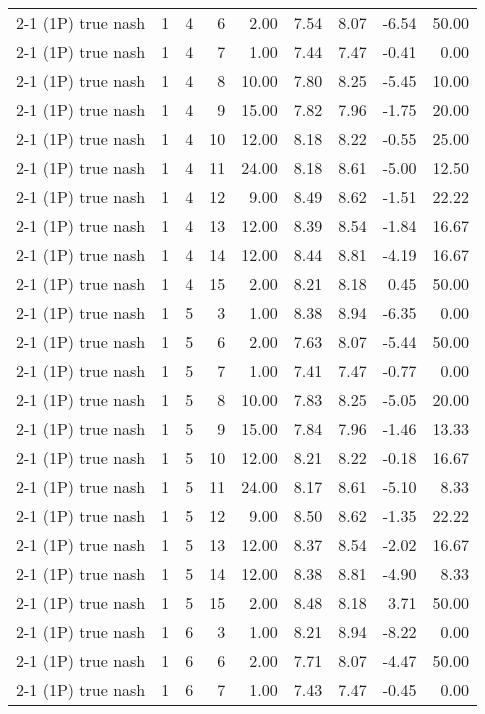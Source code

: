\begin{tabular}{lrrrrrrrr}
2-1 (1P) true nash & 1 & 4 & 6 & 2.00 & 7.54 & 8.07 & -6.54 & 50.00 \\
2-1 (1P) true nash & 1 & 4 & 7 & 1.00 & 7.44 & 7.47 & -0.41 & 0.00 \\
2-1 (1P) true nash & 1 & 4 & 8 & 10.00 & 7.80 & 8.25 & -5.45 & 10.00 \\
2-1 (1P) true nash & 1 & 4 & 9 & 15.00 & 7.82 & 7.96 & -1.75 & 20.00 \\
2-1 (1P) true nash & 1 & 4 & 10 & 12.00 & 8.18 & 8.22 & -0.55 & 25.00 \\
2-1 (1P) true nash & 1 & 4 & 11 & 24.00 & 8.18 & 8.61 & -5.00 & 12.50 \\
2-1 (1P) true nash & 1 & 4 & 12 & 9.00 & 8.49 & 8.62 & -1.51 & 22.22 \\
2-1 (1P) true nash & 1 & 4 & 13 & 12.00 & 8.39 & 8.54 & -1.84 & 16.67 \\
2-1 (1P) true nash & 1 & 4 & 14 & 12.00 & 8.44 & 8.81 & -4.19 & 16.67 \\
2-1 (1P) true nash & 1 & 4 & 15 & 2.00 & 8.21 & 8.18 & 0.45 & 50.00 \\
2-1 (1P) true nash & 1 & 5 & 3 & 1.00 & 8.38 & 8.94 & -6.35 & 0.00 \\
2-1 (1P) true nash & 1 & 5 & 6 & 2.00 & 7.63 & 8.07 & -5.44 & 50.00 \\
2-1 (1P) true nash & 1 & 5 & 7 & 1.00 & 7.41 & 7.47 & -0.77 & 0.00 \\
2-1 (1P) true nash & 1 & 5 & 8 & 10.00 & 7.83 & 8.25 & -5.05 & 20.00 \\
2-1 (1P) true nash & 1 & 5 & 9 & 15.00 & 7.84 & 7.96 & -1.46 & 13.33 \\
2-1 (1P) true nash & 1 & 5 & 10 & 12.00 & 8.21 & 8.22 & -0.18 & 16.67 \\
2-1 (1P) true nash & 1 & 5 & 11 & 24.00 & 8.17 & 8.61 & -5.10 & 8.33 \\
2-1 (1P) true nash & 1 & 5 & 12 & 9.00 & 8.50 & 8.62 & -1.35 & 22.22 \\
2-1 (1P) true nash & 1 & 5 & 13 & 12.00 & 8.37 & 8.54 & -2.02 & 16.67 \\
2-1 (1P) true nash & 1 & 5 & 14 & 12.00 & 8.38 & 8.81 & -4.90 & 8.33 \\
2-1 (1P) true nash & 1 & 5 & 15 & 2.00 & 8.48 & 8.18 & 3.71 & 50.00 \\
2-1 (1P) true nash & 1 & 6 & 3 & 1.00 & 8.21 & 8.94 & -8.22 & 0.00 \\
2-1 (1P) true nash & 1 & 6 & 6 & 2.00 & 7.71 & 8.07 & -4.47 & 50.00 \\
2-1 (1P) true nash & 1 & 6 & 7 & 1.00 & 7.43 & 7.47 & -0.45 & 0.00 \\

\end{tabular}
